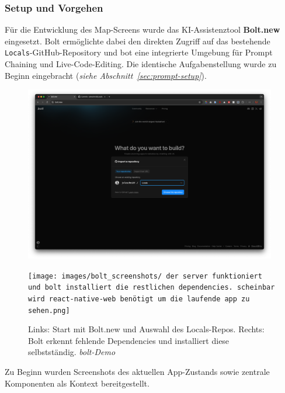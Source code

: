\subsubsection{Setup und Vorgehen}
Für die Entwicklung des Map-Screens wurde das KI-Assistenztool
\textbf{Bolt.new} eingesetzt. Bolt ermöglichte dabei den direkten Zugriff auf
das bestehende \texttt{Locals}-GitHub-Repository und bot eine integrierte
Umgebung für Prompt Chaining und Live-Code-Editing. Die identische
Aufgabenstellung wurde zu Beginn eingebracht (\emph{siehe
      Abschnitt~\ref{sec:prompt-setup}}).

\begin{figure}[htbp]
      \centering
      \vspace{1em}
      \begin{minipage}{0.48\textwidth}
            \centering
            \includegraphics[width=0.98\textwidth]{images/bolt_screenshots/startseite-what-do-you-wanna-build-mit-github-branch.png}
      \end{minipage}
      \hfill
      \begin{minipage}{0.48\textwidth}
            \centering
            \texttt{[image: images/bolt\_screenshots/ der server funktioniert und bolt installiert die restlichen dependencies. scheinbar wird react-native-web benötigt um die laufende app zu sehen.png]}
      \end{minipage}
      \caption{Links: Start mit Bolt.new und Auswahl des Locals-Repos. Rechts: Bolt erkennt fehlende Dependencies und installiert diese selbstständig. \textit{bolt-Demo}}
      \label{fig:bolt-setup}
\end{figure}

Zu Beginn wurden Screenshots des aktuellen App-Zustands sowie zentrale
Komponenten als Kontext bereitgestellt.

